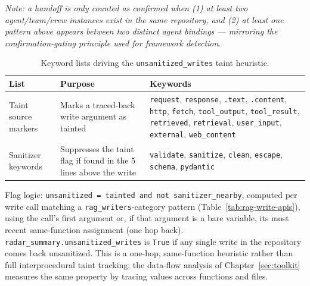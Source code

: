 \textit{Note: a handoff is only counted as confirmed when (1) at least two agent/team/crew instances exist in the same repository, and (2) at least one pattern above appears between two distinct agent bindings --- mirroring the confirmation-gating principle used for framework detection.}


\begin{table}[htbp]
\centering
\footnotesize
\renewcommand{\arraystretch}{0.9}
\caption{Keyword lists driving the \texttt{unsanitized\_writes} taint heuristic.}
\label{tab:unsanitized-keywords}
\begin{tabular}{@{}p{}p{}p{}@{}}
\toprule
\textbf{List} & \textbf{Purpose} & \textbf{Keywords} \\
\midrule
Taint source markers & Marks a traced-back write argument as tainted &
\texttt{request}, \texttt{response}, \texttt{.text}, \texttt{.content}, \texttt{http}, \texttt{fetch}, \texttt{tool\_output}, \texttt{tool\_result}, \texttt{retrieved}, \texttt{retrieval}, \texttt{user\_input}, \texttt{external}, \texttt{web\_content} \\
\midrule
Sanitizer keywords & Suppresses the taint flag if found in the 5 lines above the write &
\texttt{validate}, \texttt{sanitize}, \texttt{clean}, \texttt{escape}, \texttt{schema}, \texttt{pydantic} \\
\bottomrule
\end{tabular}
\end{table}

\noindent
Flag logic: \texttt{unsanitized = tainted and not sanitizer\_nearby}, computed per write call matching a \texttt{rag\_writers}-category pattern (Table~\ref{tab:rag-write-apis}), using the call's first argument or, if that argument is a bare variable, its most recent same-function assignment (one hop back). \texttt{radar\_summary.unsanitized\_writes} is \texttt{True} if any single write in the repository comes back unsanitized. This is a one-hop, same-function heuristic rather than full interprocedural taint tracking; the data-flow analysis of Chapter~\ref{sec:toolkit} measures the same property by tracing values across functions and files.


